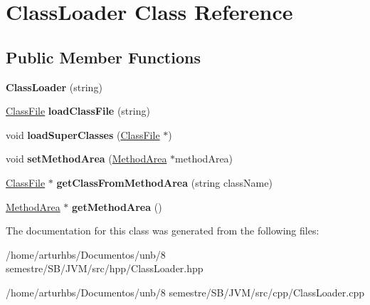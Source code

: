 \hypertarget{classClassLoader}{}\section{Class\+Loader Class Reference}
\label{classClassLoader}
\subsection*{Public Member Functions}
\begin{DoxyCompactItemize}
\item 
{\bfseries Class\+Loader} (string)\hypertarget{classClassLoader_a33dea7f5288f739017d61d462b935506}{}\label{classClassLoader_a33dea7f5288f739017d61d462b935506}

\item 
\hyperlink{classClassFile}{Class\+File} {\bfseries load\+Class\+File} (string)\hypertarget{classClassLoader_a368e94d895b9e99c66e9b39dd7025e67}{}\label{classClassLoader_a368e94d895b9e99c66e9b39dd7025e67}

\item 
void {\bfseries load\+Super\+Classes} (\hyperlink{classClassFile}{Class\+File} $\ast$)\hypertarget{classClassLoader_ad704891933608240ea282e835e92aaa2}{}\label{classClassLoader_ad704891933608240ea282e835e92aaa2}

\item 
void {\bfseries set\+Method\+Area} (\hyperlink{classMethodArea}{Method\+Area} $\ast$method\+Area)\hypertarget{classClassLoader_a3f432b26ce13cd17da2986320b6060c8}{}\label{classClassLoader_a3f432b26ce13cd17da2986320b6060c8}

\item 
\hyperlink{classClassFile}{Class\+File} $\ast$ {\bfseries get\+Class\+From\+Method\+Area} (string class\+Name)\hypertarget{classClassLoader_ac792ecbaa98738fddee0c4285759ce2c}{}\label{classClassLoader_ac792ecbaa98738fddee0c4285759ce2c}

\item 
\hyperlink{classMethodArea}{Method\+Area} $\ast$ {\bfseries get\+Method\+Area} ()\hypertarget{classClassLoader_a2a28f4514a3223fa4534d5dccd12612c}{}\label{classClassLoader_a2a28f4514a3223fa4534d5dccd12612c}

\end{DoxyCompactItemize}


The documentation for this class was generated from the following files\+:\begin{DoxyCompactItemize}
\item 
/home/arturhbs/\+Documentos/unb/8 semestre/\+S\+B/\+J\+V\+M/src/hpp/Class\+Loader.\+hpp\item 
/home/arturhbs/\+Documentos/unb/8 semestre/\+S\+B/\+J\+V\+M/src/cpp/Class\+Loader.\+cpp\end{DoxyCompactItemize}
